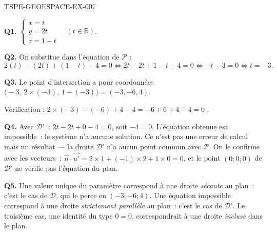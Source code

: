 \begin{corrige}{TSPE-GEOESPACE-EX-007}

\textbf{Q1.} $\begin{cases}x=t\\y=2t\\z=1-t\end{cases}\quad(t\in\mathbb{R})$.

\textbf{Q2.} On substitue dans l'équation de $\mathcal{P}$ :
\[
  2(t)-(2t)+(1-t)-4=0 \iff 2t-2t+1-t-4=0 \iff -t-3=0 \iff t=-3.
\]

\textbf{Q3.} Le point d'intersection a pour coordonnées $\big(-3,\,2\times(-3),\,1-(-3)\big) = (-3,-6,4)$.

Vérification : $2\times(-3)-(-6)+4-4 = -6+6+4-4=0$ \checkmark.


\textbf{Q4.} Avec $\mathcal{D}'$~: $2t-2t+0-4=0$, soit $-4=0$. L'équation
obtenue est impossible~: le système n'a aucune solution. Ce n'est pas une
erreur de calcul mais un résultat --- la droite $\mathcal{D}'$ n'a aucun point
commun avec $\mathcal{P}$. On le confirme avec les vecteurs~:
$\vec{n}\cdot\vec{u'}=2\times1+(-1)\times2+1\times0=0$, et le point $(0;0;0)$
de $\mathcal{D}'$ ne vérifie pas l'équation du plan.

\textbf{Q5.} Une valeur unique du paramètre correspond à une droite
\emph{sécante} au plan~: c'est le cas de $\mathcal{D}$, qui le perce en
$(-3;-6;4)$. Une équation impossible correspond à une droite
\emph{strictement parallèle} au plan~: c'est le cas de $\mathcal{D}'$. Le
troisième cas, une identité du type $0=0$, correspondrait à une droite
\emph{incluse} dans le plan.

\end{corrige}
